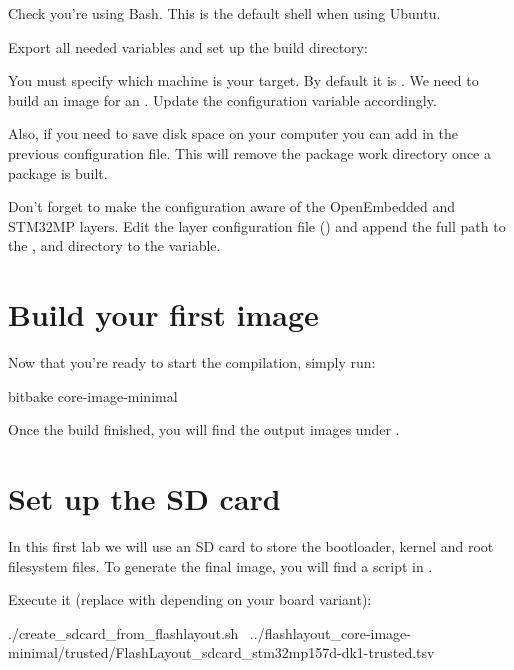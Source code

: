 Check you're using Bash. This is the default shell when using Ubuntu.

Export all needed variables and set up the build directory:

You must specify which machine is your target. By default it
is . We need to build an image for an .
Update the  configuration variable accordingly.

Also, if you need to save disk space on your computer you can add  in the previous configuration file. This will remove the
package work directory once a package is built.

Don't forget to make the configuration aware of the OpenEmbedded and
STM32MP layers. Edit the layer configuration file
() and append the full path to the
,  and  directory to the
 variable.

\section{Build your first image}

Now that you're ready to start the compilation, simply run:
\begin{bashinput}
bitbake core-image-minimal
\end{bashinput}

Once the build finished, you will find the output images under
.

\section{Set up the SD card}

In this first lab we will use an SD card to store the bootloader, kernel and
root filesystem files. To generate the final image, you will find a script in
.

Execute it (replace  with  depending on your board variant):
\begin{bashinput}
./create_sdcard_from_flashlayout.sh \
../flashlayout_core-image-minimal/trusted/FlashLayout_sdcard_stm32mp157d-dk1-trusted.tsv
\end{bashinput}

